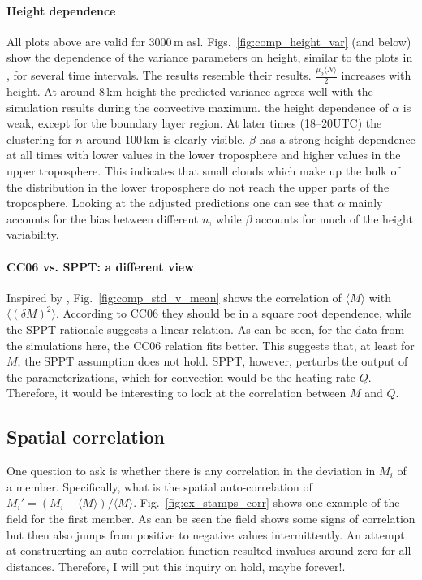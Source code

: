 \documentclass[a4paper, 12pt]{article}
\begin{document}
\paragraph{Height dependence} All plots above are valid for 3000\,m asl. Figs.~\ref{fig:comp_height_var} (and below) show the dependence of the variance parameters on height, similar to the plots in \cite{Davoudi2010}, for several time intervals. The results resemble their results. $\frac{\mu_2 \langle N \rangle}{2}$ increases with height. At around 8\,km height the predicted variance agrees well with the simulation results during the convective maximum. the height dependence of $\alpha$ is weak, except for the boundary layer region. At later times (18--20UTC) the clustering for $n$ around 100\,km is clearly visible. $\beta$ has a strong height dependence at all times with lower values in the lower troposphere and higher values in the upper troposphere. This indicates that small clouds which make up the bulk of the distribution in the lower troposphere do not reach the upper parts of the troposphere. Looking at the adjusted predictions one can see that $\alpha$ mainly accounts for the bias between different $n$, while $\beta$ accounts for much of the height variability. 

\paragraph{CC06 vs. SPPT: a different view}
Inspired by \cite{Shutts2007}, Fig.~\ref{fig:comp_std_v_mean} shows the correlation of $\langle M \rangle$ with $\langle (\delta M)^2 \rangle$. According to CC06 they should be in a square root dependence, while the SPPT rationale suggests a linear relation. As can be seen, for the data from the simulations here, the CC06 relation fits better. This suggests that, at least for $M$, the SPPT assumption does not hold. SPPT, however, perturbs the output of the parameterizations, which for convection would be the heating rate $Q$. Therefore, it would be interesting to look at the correlation between $M$ and $Q$. 

\subsection{Spatial correlation}
One question to ask is whether there is any correlation in the deviation in $M_i$ of a member. Specifically, what is the spatial auto-correlation of $M_{i}' = (M_i - \langle M \rangle)/\langle M \rangle$. Fig.~\ref{fig:ex_stamps_corr} shows one example of the field for the first member. As can be seen the field shows some signs of correlation but then also jumps from positive to negative values intermittently. An attempt at construcrting an auto-correlation function resulted invalues around zero for all distances. Therefore, I will put this inquiry on hold, maybe forever!.
\end{document}
